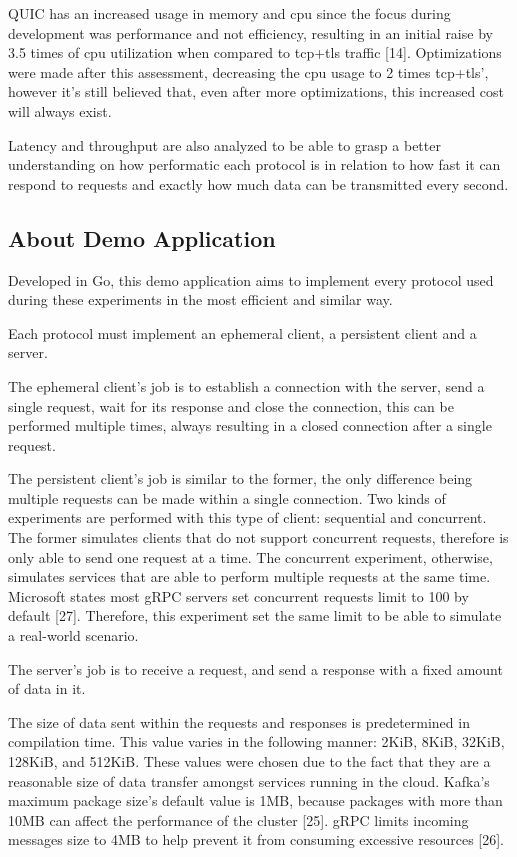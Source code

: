 QUIC has an increased usage in memory and \gls{cpu} since the focus during development was performance and not efficiency, resulting in an initial raise by 3.5 times of \gls{cpu} utilization when compared to \gls{tcp}+\gls{tls} traffic [14]. Optimizations were made after this assessment, decreasing the \gls{cpu} usage to 2 times \gls{tcp}+\gls{tls}’, however it’s still believed that, even after more optimizations, this increased cost will always exist.

Latency and throughput are also analyzed to be able to grasp a better understanding on how performatic each protocol is in relation to how fast it can respond to requests and exactly how much data can be transmitted every second.

\subsection{About Demo Application}

Developed in Go, this demo application aims to implement every protocol used during these experiments in the most efficient and similar way.

Each protocol must implement an ephemeral client, a persistent client and a server. 

The ephemeral client’s job is to establish a connection with the server, send a single request, wait for its response and close the connection, this can be performed multiple times, always resulting in a closed connection after a single request. 

The persistent client’s job is similar to the former, the only difference being multiple requests can be made within a single connection. Two kinds of experiments are performed with this type of client: sequential and concurrent. The former simulates clients that do not support concurrent requests, therefore is only able to send one request at a time. The concurrent experiment, otherwise, simulates services that are able to perform multiple requests at the same time. Microsoft states most gRPC servers set concurrent requests limit to 100 by default [27]. Therefore, this experiment set the same limit to be able to simulate a real-world scenario.

The server’s job is to receive a request, and send a response with a fixed amount of data in it.

The size of data sent within the requests and responses is predetermined in compilation time. This value varies in the following manner: 2KiB, 8KiB, 32KiB, 128KiB, and 512KiB. These values were chosen due to the fact that they are a reasonable size of data transfer amongst services running in the cloud. Kafka's maximum package size’s default value is 1MB, because packages with more than 10MB can affect the performance of the cluster [25]. gRPC limits incoming messages size to 4MB to help prevent it from consuming excessive resources [26].

